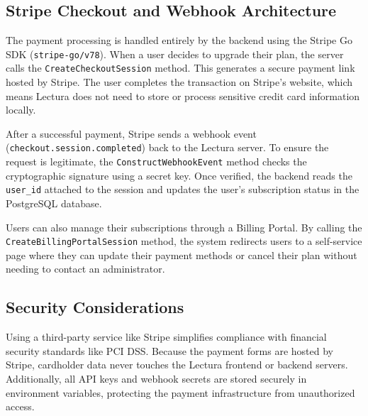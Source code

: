 \subsection{Stripe Checkout and Webhook Architecture}
The payment processing is handled entirely by the backend using the Stripe Go SDK (\texttt{stripe-go/v78}). When a user decides to upgrade their plan, the server calls the \texttt{CreateCheckoutSession} method. This generates a secure payment link hosted by Stripe. The user completes the transaction on Stripe's website, which means Lectura does not need to store or process sensitive credit card information locally.

After a successful payment, Stripe sends a webhook event (\texttt{checkout.session.completed}) back to the Lectura server. To ensure the request is legitimate, the \texttt{ConstructWebhookEvent} method checks the cryptographic signature using a secret key. Once verified, the backend reads the \texttt{user\_id} attached to the session and updates the user's subscription status in the PostgreSQL database.

Users can also manage their subscriptions through a Billing Portal. By calling the \texttt{CreateBillingPortalSession} method, the system redirects users to a self-service page where they can update their payment methods or cancel their plan without needing to contact an administrator.

\subsection{Security Considerations}
Using a third-party service like Stripe simplifies compliance with financial security standards like PCI DSS. Because the payment forms are hosted by Stripe, cardholder data never touches the Lectura frontend or backend servers. Additionally, all API keys and webhook secrets are stored securely in environment variables, protecting the payment infrastructure from unauthorized access.